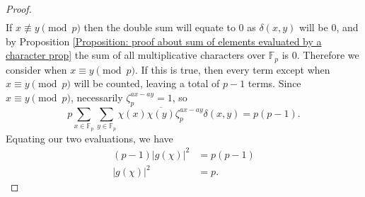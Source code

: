 \documentclass[10pt,a4paper]{amsart}
\begin{document}
\begin{proof}
\begin{align*}
    \end{align*}
    If $x\not\equiv y\pmod{p}$ then the double sum will equate to $0$ as $\delta(x,y)$ will be $0$, and by Proposition \ref{Proposition: proof about sum of elements evaluated by a character prop} the sum of all multiplicative characters over $\mathbb{F}_{p}$ is 0. Therefore we consider when $x\equiv y\pmod{p}$. If this is true, then every term except when $x\equiv y\pmod{p}$ will be counted, leaving a total of $p-1$ terms. Since $x\equiv y\pmod{p}$, necessarily $\zeta_{p}^{ax-ay}=1$, so
    \begin{equation*}
        p\sum_{x\in\mathbb{F}_{p}}\sum_{y\in\mathbb{F}_{p}}\chi(x)\overline{\chi(y)}\zeta_{p}^{ax-ay}\delta(x,y) = p(p-1).
    \end{equation*}
    Equating our two evaluations, we have 
    \begin{align*}
        (p-1)|g(\chi)|^{2} & = p(p-1) \\
        |g(\chi)|^{2} & = p.
    \end{align*}
\end{proof}
\end{document}
